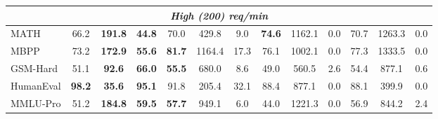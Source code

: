 \begin{table}[t]
{\begin{tabular}{l|ccc|ccc|ccc|ccc}
\midrule
\multicolumn{13}{c}{\textit{High (200) req/min}} \\
\midrule
MATH & 66.2 & \textbf{191.8} & \textbf{44.8} & 70.0 & 429.8 & 9.0 & \textbf{74.6} & 1162.1 & 0.0 & 70.7 & 1263.3 & 0.0 \\
MBPP & 73.2 & \textbf{172.9} & \textbf{55.6} & \textbf{81.7} & 1164.4 & 17.3 & 76.1 & 1002.1 & 0.0 & 77.3 & 1333.5 & 0.0 \\
GSM-Hard & 51.1 & \textbf{92.6} & \textbf{66.0} & \textbf{55.5} & 680.0 & 8.6 & 49.0 & 560.5 & 2.6 & 54.4 & 877.1 & 0.6 \\
HumanEval & \textbf{98.2} & \textbf{35.6} & \textbf{95.1} & 91.8 & 205.4 & 32.1 & 88.4 & 877.1 & 0.0 & 88.1 & 399.9 & 0.0 \\
MMLU-Pro & 51.2 & \textbf{184.8} & \textbf{59.5} & \textbf{57.7} & 949.1 & 6.0 & 44.0 & 1221.3 & 0.0 & 56.9 & 844.2 & 2.4 \\
\bottomrule
\end{tabular}}
\end{table}